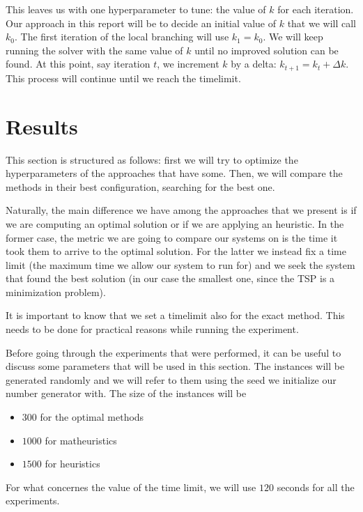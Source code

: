 \documentclass{article}
\begin{document}
This leaves us with one hyperparameter to tune: the value of $k$ for each iteration.
Our approach in this report will be to decide an initial value of $k$ that we will call
$k_{0}$. The first iteration of the local branching will use $k_{1} = k_{0}$.
We will keep running the solver with the same value of $k$ until no improved
solution can be found. At this point, say iteration $t$, we increment $k$ by a delta:
$k_{t+1} = k_{t} + \Delta k$. This process will continue until we reach the timelimit.

\newpage

\section{Results}
\label{sec:results}
This section is structured as follows: first we will try to optimize the hyperparameters
of the approaches that have some. Then, we will compare the methods in their best configuration,
searching for the best one.

Naturally, the main difference we have among the approaches that we present is if we are computing
an optimal solution or if we are applying an heuristic. In the former case, the metric we are going
to compare our systems on is the time it took them to arrive to the optimal solution.
For the latter we instead fix a time limit (the maximum time we allow our system to run for) and
we seek the system that found the best solution (in our case the smallest one, since the TSP
is a minimization problem).

It is important to know that we set a timelimit also for the exact method. This
needs to be done for practical reasons while running the experiment.

Before going through the experiments that were performed, it can be useful to discuss some
parameters that will be used in this section.
The instances will be generated randomly and we will refer to them using the seed we
initialize our number generator with.
The size of the instances will be
\begin{itemize}
        \item $300$ for the optimal methods
        \item $1000$ for matheuristics
        \item $1500$ for heuristics
\end{itemize}

For what concernes the value of the time limit, we will use $120$ seconds for all the
experiments.
\end{document}
